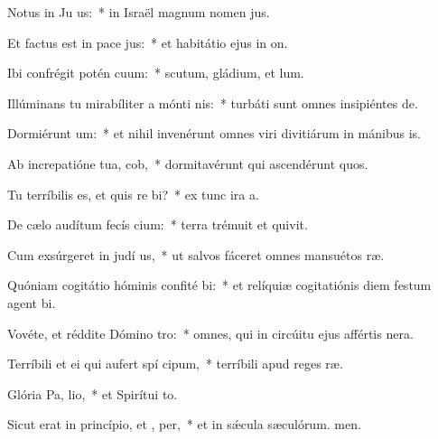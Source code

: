 \item Notus in Ju us:~* in Israël magnum nomen jus.
\item Et factus est in pace  jus:~* et habitátio ejus in on.
\item Ibi confrégit potén cuum:~* scutum, gládium, et lum.
\item Illúminans tu mirabíliter a mónti nis:~* turbáti sunt omnes insipiéntes de.
\item Dormiérunt  um:~* et nihil invenérunt omnes viri divitiárum in mánibus is.
\item Ab increpatióne tua,  cob,~* dormitavérunt qui ascendérunt quos.
\item Tu terríbilis es, et quis re bi?~* ex tunc ira a.
\item De cælo audítum fecís cium:~* terra trémuit et quivit.
\item Cum exsúrgeret in judí us,~* ut salvos fáceret omnes mansuétos ræ.
\item Quóniam cogitátio hóminis confité bi:~* et relíquiæ cogitatiónis diem festum agent bi.
\item Vovéte, et réddite Dómino  tro:~* omnes, qui in circúitu ejus affértis nera.
\item Terríbili et ei qui aufert spí cipum,~* terríbili apud reges ræ.
\item Glória Pa,  lio,~* et Spirítui to.
\item Sicut erat in princípio, et ,  per,~* et in sǽcula sæculórum. men.
